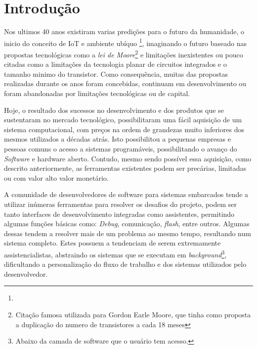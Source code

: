 \chapter{Introdução}
Nos ultimos 40 anos existiram varias predições para o futuro da humanidade, o inicio do conceito de IoT\cite{gates1995estrada} e ambiente ubíquo \footnote{}, imaginando o futuro baseado nas propostas tecnológicas como a \textit{lei de Moore}\footnote{Citação famosa utilizada para Gordon Earle Moore, que tinha como proposta a duplicação do numero de transistores a cada 18 meses} e limitações inexistentes ou pouco citadas como a limitações da tecnologia planar de circuitos integrados e o tamanho minimo do transistor. Como consequência, muitas das propostas realizadas durante os anos foram concebidas, continuam em desenvolvimento ou foram abandonadas por limitações tecnológicas ou de capital.

\iffalse
Muitas das propostas que continuam ativas são extremamente dependentes do desenvolvimento da eletrônica para a sua concepção, encontrando desafios não só para a confecção destes, como também sua utilização pelos desenvolvedores.
\fi

Hoje, o resultado dos sucessos no desenvolvimento e dos produtos que se sustentaram no mercado tecnológico, possibilitaram uma fácil aquisição de um sistema computacional, com preços na ordem de grandezas muito inferiores dos mesmos utilizados a décadas atrás. Isto possibilitou a pequenas empresas e pessoas comuns o acesso a sistemas programáveis, possibilitando o avanço do \textit{Software} e hardware aberto. Contudo, mesmo sendo possível essa aquisição, como descrito anteriormente, as ferramentas existentes podem ser precárias, limitadas ou com valor alto valor monetário.

A comunidade de desenvolvedores de software para sistemas embarcados tende a utilizar inúmeras ferramentas para resolver os desafios do projeto, podem ser tanto interfaces de desenvolvimento integradas como assistentes, permitindo algumas funções básicas como: \textit{Debug}, comunicação, \textit{flash}, entre outros. Algumas dessas tendem a resolver mais de um problema ao mesmo tempo, resultando num sistema completo. Estes possuem a tendenciam de serem extremamente assistencialistas, abstraindo os sistemas que se executam em \textit{background}\footnote{Abaixo da camada de software que o usuário tem acesso.}, dificultando a personalização do fluxo de trabalho e dos sistemas utilizados pelo desenvolvedor.


